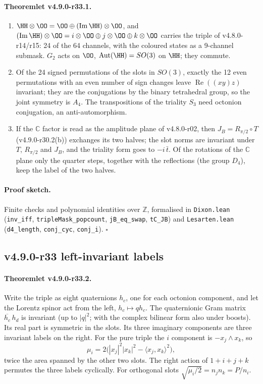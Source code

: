 \paragraph{Theoremlet v4.9.0-r33.1.}
\begin{enumerate}[leftmargin=2em]
\item[(a)] \(\HH\otimes\OO=\OO\oplus(\operatorname{Im}\HH)\otimes\OO\), and \((\operatorname{Im}\HH)\otimes\OO=i\otimes\OO\oplus
j\otimes\OO\oplus k\otimes\OO\) carries the triple of v4.8.0-r14/r15: 24 of the 64 channels, with the coloured states as a
9-channel submask.  \(G_2\) acts on \(\OO\), \(\operatorname{Aut}(\HH)=SO(3)\) on \(\HH\); they commute.
\item[(b)] Of the 24 signed permutations of the slots in \(SO(3)\), exactly the 12 even permutations with an even number of
sign changes leave \(\operatorname{Re}((xy)z)\) invariant; they are the conjugations by the binary tetrahedral group, so
the joint symmetry is \(A_4\).  The transpositions of the triality \(S_3\) need octonion conjugation, an anti-automorphism.
\item[(c)] If the \(\mathbb C\) factor is read as the amplitude plane of v4.8.0-r02, then \(J_B=R_{\pi/2}\circ T\) (v4.9.0-r30.2(b))
exchanges its two halves; the slot norms are invariant under \(T\), \(R_{\pi/2}\) and \(J_B\), and the triality form goes to
\(-i\,\bar t\).  Of the rotations of the \(\mathbb C\) plane only the quarter steps, together with the reflections (the
group \(D_4\)), keep the label of the two halves.
\end{enumerate}

\paragraph{Proof sketch.}
Finite checks and polynomial identities over \(\mathbb Z\), formalised in \texttt{Dixon.lean} (\texttt{inv\_iff},
\texttt{tripleMask\_popcount}, \texttt{jB\_eq\_swap}, \texttt{tC\_JB}) and \texttt{Lesarten.lean} (\texttt{d4\_length},
\texttt{conj\_cyc}, \texttt{conj\_i}).  \(\square\)

\subsection*{v4.9.0-r33 left-invariant labels}
\label{subsec:v490-r33-labels}

\paragraph{Theoremlet v4.9.0-r33.2.}
Write the triple as eight quaternions \(h_c\), one for each octonion component, and let the Lorentz spinor act from the
left, \(h_c\mapsto qh_c\).  The quaternionic Gram matrix \(\overline{h_c}\,h_d\) is invariant (up to \(|q|^2\); with the complex
bilinear form also under boosts).  Its real part is symmetric in the slots.  Its three imaginary components are three
invariant labels on the right.  For the pure triple the \(i\) component is \(-x_j\wedge x_k\), so
\[
\mu_i=2\bigl(|x_j|^2|x_k|^2-\langle x_j,x_k\rangle^2\bigr),
\]
twice the area spanned by the other two slots.  The right action of \(1+i+j+k\) permutes the three labels cyclically.  For
orthogonal slots \(\sqrt{\mu_i/2}=n_jn_k=P/n_i\).

